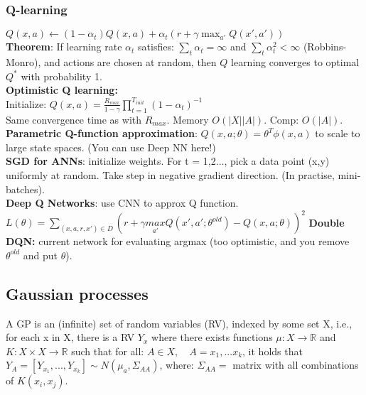 \subsubsection{Q-learning}
$Q(x,a) \leftarrow (1-\alpha_t)Q(x,a) + \alpha_t(r+\gamma \max_{a'}Q(x', a'))$\\
\textbf{Theorem}: If learning rate $\alpha_t$ satisfies: $\sum_t \alpha_t=\infty$ and $\sum_t \alpha_t^2 < \infty$ (Robbins-Monro), and actions are chosen at random, then $Q$ learning converges to optimal $Q^*$ with probability 1.\\
\textbf{Optimistic Q learning:}\\
Initialize: $Q(x,a)=\frac{R_{max}}{1-\gamma}\prod_{t=1}^{T_{init}}(1-\alpha_t)^{-1}$\\
Same convergence time as with $R_{max}$. Memory $O(|X||A|)$. Comp: $O(|A|)$.\\
\textbf{Parametric Q-function approximation}: $Q(x,a;\theta)=\theta^T\phi (x,a)$ to scale to large state spaces. (You can use Deep NN here!)\\
\textbf{SGD for ANNs}: initialize weights. For t = 1,2..., pick a data point (x,y) uniformly at random. Take step in negative gradient direction. (In practise, mini-batches).\\
\textbf{Deep Q Networks}: use CNN to approx Q function.
$ L(\theta)=\sum_{(x,a,r,x')\in D}(r+\gamma\underset{a'}{max}Q(x',a';\theta^{old})-Q(x,a;\theta))^2$ \textbf{Double DQN:} current network for evaluating argmax (too optimistic, and you remove $\theta^{old}$ and put $\theta$).

\subsection{Gaussian processes}
A GP is an (infinite) set of random variables (RV), indexed by some set X, i.e., for each x in X, there is a RV $Y_x$ where there exists functions $\mu : X \rightarrow \mathbb{R}$ and $K: X \times X \rightarrow \mathbb{R}$ such that for all: $A \in X, \quad A={x_1,...x_k}$, it holds that $Y_A=[Y_{x_1},...,Y_{x_k}] \sim N(\mu_a, \Sigma_{AA})$, where: $\Sigma_{AA} =$ matrix with all combinations of $K(x_i, x_j)$.

